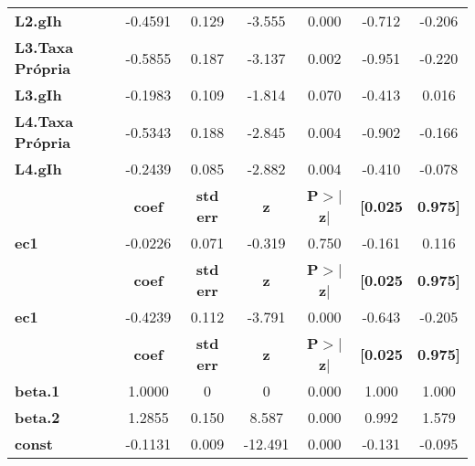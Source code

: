 \begin{center}
\begin{tabular}{lcccccc}
\textbf{L2.gIh}          &      -0.4591  &        0.129     &    -3.555  &         0.000        &       -0.712    &       -0.206     \\
\textbf{L3.Taxa Própria} &      -0.5855  &        0.187     &    -3.137  &         0.002        &       -0.951    &       -0.220     \\
\textbf{L3.gIh}          &      -0.1983  &        0.109     &    -1.814  &         0.070        &       -0.413    &        0.016     \\
\textbf{L4.Taxa Própria} &      -0.5343  &        0.188     &    -2.845  &         0.004        &       -0.902    &       -0.166     \\
\textbf{L4.gIh}          &      -0.2439  &        0.085     &    -2.882  &         0.004        &       -0.410    &       -0.078     \\
             & \textbf{coef} & \textbf{std err} & \textbf{z} & \textbf{P$> |$z$|$} & \textbf{[0.025} & \textbf{0.975]}  \\
\midrule
\textbf{ec1} &      -0.0226  &        0.071     &    -0.319  &         0.750        &       -0.161    &        0.116     \\
             & \textbf{coef} & \textbf{std err} & \textbf{z} & \textbf{P$> |$z$|$} & \textbf{[0.025} & \textbf{0.975]}  \\
\midrule
\textbf{ec1} &      -0.4239  &        0.112     &    -3.791  &         0.000        &       -0.643    &       -0.205     \\
                & \textbf{coef} & \textbf{std err} & \textbf{z} & \textbf{P$> |$z$|$} & \textbf{[0.025} & \textbf{0.975]}  \\
\midrule
\textbf{beta.1} &       1.0000  &            0     &         0  &         0.000        &        1.000    &        1.000     \\
\textbf{beta.2} &       1.2855  &        0.150     &     8.587  &         0.000        &        0.992    &        1.579     \\
\textbf{const}  &      -0.1131  &        0.009     &   -12.491  &         0.000        &       -0.131    &       -0.095     \\
\bottomrule
\end{tabular}
\end{center}